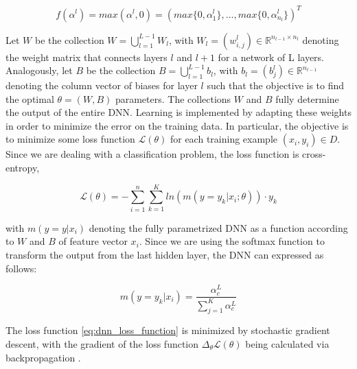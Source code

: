 \begin{equation}
    f( \alpha^{l} ) = max( \alpha^{l}, 0 ) = ( max\{0, \alpha^{l}_{1}\}, ..., max\{0, \alpha^{l}_{  n_{l}  }\} )^{T}
    \label{eq:relu}
\end{equation}

Let $ W $ be the collection $ W = \bigcup_{l=1}^{L - 1} W_{l} $, with $W_{l} = (w_{i, j}^{l}) \in \mathbb{R}^{ n_{l - 1} \times n_{l} } $ denoting the
weight matrix that connects layers $l$ and $l + 1$ for a network of L layers. Analogously, let $B$
be the collection $ B = \bigcup_{l=1}^{L - 1} b_{l}  $,
with $ b_{l} = ( b_{j}^{l} ) \in \mathbb{R}^{ n_{l - 1} } $ denoting the column vector of biases for layer $l$ such that the objective is to find
the optimal $ \theta = (W, B) $ parameters.
The collections $W$ and $B$ fully determine the output of the entire DNN. Learning is implemented
by adapting these weights in order to minimize the error on the training data. In particular,
the objective is to minimize some loss function $\mathscr{L} (\theta)$ for each training example $(x_{i}, y_{i}) \in D$. 
Since we are dealing with a classification problem, the loss function is cross-entropy,

\begin{equation}
    \mathscr{L} (\theta) = - \sum_{i=1}^{n} \sum_{ k=1 }^{K}  ln( m(y=y_{k} | x_{i}; \theta))  \cdot y_{k}
    \label{eq:dnn_loss_function}
\end{equation}

with $ m(y=y| x_{i}) $ denoting the fully parametrized DNN as a function according to $W$ and $B$ of feature vector $x_{i}$. 
Since we are using  the softmax function \cite{dixon2015annMarketPrediction} to transform the output from the last hidden layer,
the DNN can expressed as follows:

\begin{equation}
    m( y=y_{k} | x_{i} ) =  \frac{ \alpha_{c}^{L} }{ \sum_{j=1}^{K} \alpha_{c}^{L} }
\end{equation}

The loss function \ref{eq:dnn_loss_function} is minimized
by stochastic gradient descent, with the gradient of the loss function $\Delta_{\theta} \mathscr{L} (\theta)$
being calculated via backpropagation \cite{krauss2016arbitrageSandP}.


